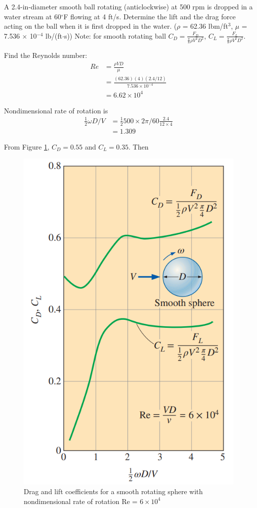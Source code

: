 \section{}

A 2.4-in-diameter smooth ball rotating (anticlockwise) at 500 rpm is dropped in a water stream at 60$^\circ$F flowing at 4 ft/s. 
Determine the lift and the drag force acting on the ball when it is first dropped in the water. 
($\rho$ = 62.36 lbm/ft$^3$, $\mu$ = 7.536 $\times$ 10$^{-4}$ lb/(ft$\cdot$s))
Note: for smooth rotating ball $C_D = \frac{F_D}{\frac{\pi}{8} \rho V^2 D^2}$, $C_L = \frac{F_L}{\frac{\pi}{8} \rho V^2 D^2}$.

Find the Reynolds number:
\begin{align*}
    Re &= \frac{\rho V D}{\mu} \\
       &= \frac{(62.36)(4)(2.4/12)}{7.536 \times 10^{-4}} \\
       &= 6.62 \times 10^4
\end{align*}

Nondimensional rate of rotation is 
\begin{align*}
    \frac{1}{2}\omega D/V &= \frac{1}{2} 500 \times 2\pi/60 \frac{2.4}{12\times 4} \\
    &= 1.309
\end{align*}

From Figure \ref{fig:Q2Graph}, $C_D = 0.55$ and $C_L = 0.35$. Then
\begin{figure}[h]
    \centering
    \includegraphics[width=0.5\linewidth]{Questions/Figures/Q2Graph.png}
    \caption{Drag and lift coefficients for a smooth rotating sphere with nondimensional rate of rotation Re = $6 \times 10^4$}
    \label{fig:Q2Graph}
\end{figure}

